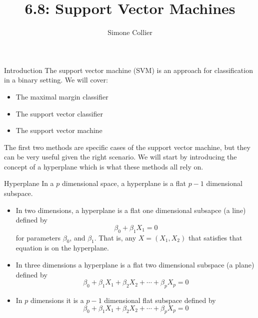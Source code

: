 \documentclass[
  ignorenonframetext,
  aspectratio=169,
]{beamer}
\title{6.8: Support Vector Machines}
\author{Simone Collier}
\date{}
\institute{The University of Toronto}
\begin{document}
\frame{\titlepage}
\ifdefined\Shaded\renewenvironment{Shaded}{\begin{tcolorbox}[sharp corners, frame hidden, interior hidden, breakable, enhanced, borderline west={3pt}{0pt}{shadecolor}, boxrule=0pt]}{\end{tcolorbox}}\fi

\begin{frame}{Introduction}
\protect\hypertarget{introduction}{}
The support vector machine (SVM) is an approach for classification in a
binary setting. We will cover:

\begin{itemize}
\item
  The maximal margin classifier
\item
  The support vector classifier
\item
  The support vector machine
\end{itemize}

The first two methods are specific cases of the support vector machine,
but they can be very useful given the right scenario. We will start by
introducing the concept of a hyperplane which is what these methods all
rely on.
\end{frame}

\begin{frame}{Hyperplane}
\protect\hypertarget{hyperplane}{}
In a \(p\) dimensional space, a hyperplane is a flat \(p-1\) dimensional
subspace.

\begin{itemize}
\item
  In two dimensions, a hyperplane is a flat one dimensional subsapce (a
  line) defined by \[\beta_{0}+\beta_{1} X_{1} = 0\] for parameters
  \(\beta_{0}\), and \(\beta_{1}\). That is, any \(X = (X_1, X_2)\) that
  satisfies that equation is on the hyperplane.
\item
  In three dimensions a hyperplane is a flat two dimensional subspace (a
  plane) defined by
  \[\beta_{0}+\beta_{1} X_{1}+\beta_{2} X_{2}+\cdots+\beta_{p} X_{p}=0\]
\item
  In \(p\) dimensions it is a \(p-1\) dimensional flat subspace defined
  by
  \[\beta_{0}+\beta_{1} X_{1}+\beta_{2} X_{2}+\cdots+\beta_{p} X_{p}=0\]
\end{itemize}
\end{frame}
\end{document}
